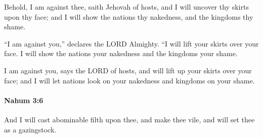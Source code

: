 			\begin{versebox}
					\item[BHS] 
					\item[LXX] 
					\item[ASV] Behold, I am against thee, saith Jehovah of hosts, and I will uncover thy skirts upon thy face; and I will show the nations thy nakedness, and the kingdoms thy shame.
					\item[NIV] “I am against you,” declares the LORD Almighty. “I will lift your skirts over your face. I will show the nations your nakedness and the kingdoms your shame.
					\item[NRSV] I am against you, says the LORD of hosts, and will lift up your skirts over your face; and I will let nations look on your nakedness and kingdoms on your shame.
			\end{versebox}

		\paragraph{Nahum 3:6} %
			\label{NAHUM-3-6}

			And I will cast abominable filth upon thee, and make thee vile, and will set thee as a gazingstock.

